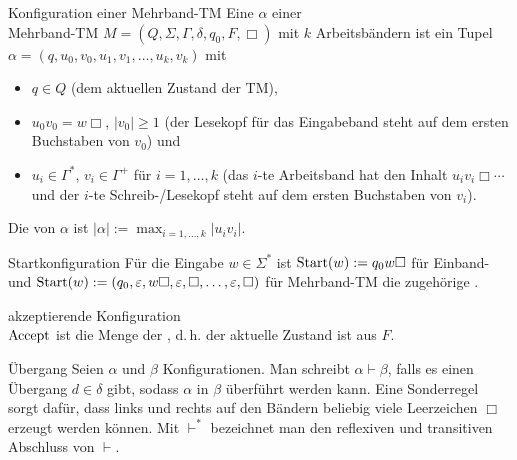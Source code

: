 \begin{Def}{Konfiguration einer Mehrband-TM}
    Eine  $\alpha$ einer\\
    Mehrband-TM
    $M = (Q, \Sigma, \Gamma, \delta, q_0, F, \Box)$ mit $k$ Arbeitsbändern ist ein Tupel\\
    $\alpha = (q, u_0, v_0, u_1, v_1, \dotsc, u_k, v_k)$ mit
    \begin{itemize}
        \item
        $q \in Q$ (dem aktuellen Zustand der TM),

        \item
        $u_0 v_0 = w \Box$, $|v_0| \ge 1$ (der Lesekopf für das Eingabeband steht auf dem ersten
        Buchstaben von $v_0$) und

        \item
        $u_i \in \Gamma^\ast$, $v_i \in \Gamma^+$ für $i = 1, \dotsc, k$
        (das $i$-te Arbeitsband hat den Inhalt $u_i v_i \Box \dotsb$ und der $i$-te
        Schreib-/Lesekopf steht auf dem ersten Buchstaben von $v_i$).
    \end{itemize}
    Die  von $\alpha$ ist $|\alpha| := \max_{i = 1, \dotsc, k} |u_i v_i|$.
\end{Def}

\linie
\pagebreak

\begin{Def}{Startkonfiguration}
    Für die Eingabe $w \in \Sigma^\ast$ ist $\text{Start}(w) := q_0 w \Box$ für Einband- und
    $\text{Start}(w) := (q_0, \varepsilon, w\Box, \varepsilon, \Box, \dotsc, \varepsilon, \Box)$
    für Mehrband-TM die zugehörige .
\end{Def}

\begin{Def}{akzeptierende Konfiguration}\\
    $\text{Accept}$ ist die Menge der ,
    d.\,h. der aktuelle Zustand ist aus $F$.
\end{Def}

\begin{Def}{Übergang}
    Seien $\alpha$ und $\beta$ Konfigurationen.
    Man schreibt $\alpha \vdash \beta$, falls es einen Übergang $d \in \delta$ gibt,
    sodass $\alpha$ in $\beta$ überführt werden kann.
    Eine Sonderregel sorgt dafür, dass links und rechts auf den Bändern beliebig viele
    Leerzeichen $\Box$ erzeugt werden können.
    Mit $\vdash^\ast$ bezeichnet man den reflexiven und transitiven Abschluss von $\vdash$.
\end{Def}

